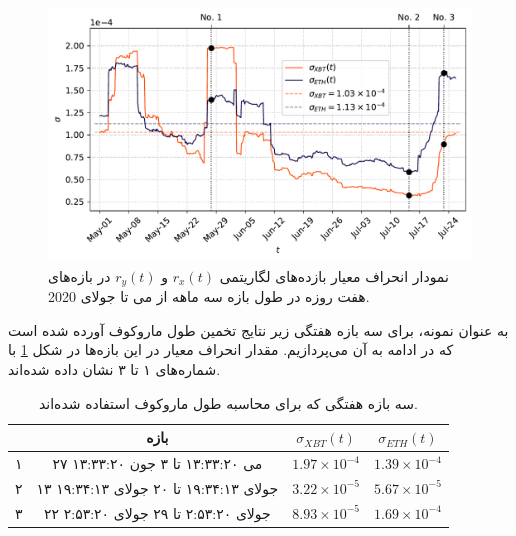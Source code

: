 \begin{figure}[H]
    \centering
    \includegraphics[width=\textwidth]{images/xbteth_volatility.pdf}
    \caption{نمودار انحراف معیار بازده‌های لگاریتمی $r_x(t)$ و $r_y(t)$ در بازه‌های هفت روزه در طول بازه سه ماهه از می تا جولای 2020.}\label{fig:xbteth_volatility}
\end{figure}
به عنوان نمونه، برای سه بازه هفتگی زیر نتایج تخمین طول ماروکوف آورده شده است که در ادامه به آن می‌پردازیم. مقدار انحراف معیار در این بازه‌ها در شکل \ref{fig:xbteth_volatility} 
با شماره‌های ۱ تا ۳ نشان داده شده‌اند.
\begin{table}[htb]
    \centering
    \caption{سه بازه هفتگی که برای محاسبه طول ماروکوف استفاده شده‌اند.\label{interval_table}}
    \begin{tabular}{|c|c|c|c|}
      \hline
      \cellcolor[HTML]{C0C0C0}& بازه & $\sigma_{XBT}(t)$ & $\sigma_{ETH}(t)$\\ \hline
        ۱ & ۲۷ می ۱۳:۳۳:۲۰ تا ۳ جون ۱۳:۳۳:۲۰ & $1.97 \times 10^{-4}$ & $1.39 \times 10^{-4}$ \\ \hline
        ۲ & ۱۳ جولای ۱۹:۳۴:۱۳ تا ۲۰ جولای ۱۹:۳۴:۱۳ & $3.22 \times 10^{-5}$ & $5.67 \times 10^{-5}$ \\ \hline
        ۳ & ۲۲ جولای ۲:۵۳:۲۰ تا ۲۹ جولای ۲:۵۳:۲۰ & $8.93 \times 10^{-5}$ & $1.69 \times 10^{-4}$\\ \hline
      \end{tabular}
  \end{table}
  \FloatBarrier

